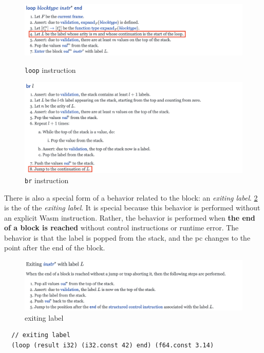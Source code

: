 \begin{figure}[h!]
    \centerline{\includegraphics[width=15cm]{fig/loop}}
    \caption[Enter the caption title here]{\texttt{loop} instruction} \label{fig:loop}
    \centerline{\includegraphics[width=15cm]{fig/br}}
    \caption[Enter the caption title here]{\texttt{br} instruction} \label{fig:br}
\end{figure}


There is also a special form of a behavior related to the block: an
\textit{exiting label}.
\cref{fig:exiting-label} is the \officialp{} of the \textit{exiting label}.
It is special because this behavior is performed without an explicit
Wasm instruction.
Rather, the behavior is performed when \textbf{the end of a block is reached}
without control instructions or runtime error.
The behavior is that the label is popped from the stack, and the pc changes to
the point after the end of the block.

\begin{figure}[h!]
    \centerline{\includegraphics[width=15cm]{fig/exiting}}
    \caption[Enter the caption title here]{exiting label} \label{fig:exiting-label}
\end{figure}


\begin{example}
\label{ex:exit}
\begin{verbatim}
  // exiting label
  (loop (result i32) (i32.const 42) end) (f64.const 3.14)
\end{verbatim}
\end{example}

